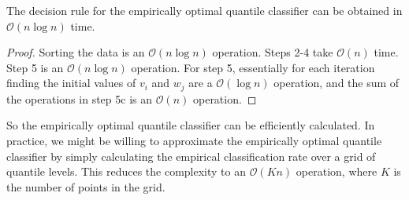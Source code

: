 \begin{lemma}
  The decision rule for the empirically optimal quantile classifier can be
  obtained in $\mathcal{O}(n \log n)$ time.
\end{lemma}

\begin{proof}
  Sorting the data is an $\mathcal{O}(n \log n)$ operation.  Steps 2-4 take
  $\mathcal{O}(n)$ time.  Step 5 is an $\mathcal{O}(n \log n)$ operation.  For
  step 5, essentially for each iteration finding the initial values of $v_i$ and
  $w_j$ are a $\mathcal{O}(\log n)$ operation, and the sum of the operations in
  step 5c is an $\mathcal{O}(n)$ operation.
\end{proof}

So the empirically optimal quantile classifier can be efficiently calculated.
In practice, we might be willing to approximate the empirically optimal quantile
classifier by simply calculating the empirical classification rate over a grid
of quantile levels.  This reduces the complexity to an $\mathcal{O}(Kn)$
operation, where $K$ is the number of points in the grid.



